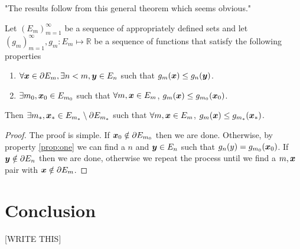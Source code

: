 		"The results follow from this general theorem which seems obvious."

		\begin{theorem}
			\label{thm:solution in interior}
			Let $(E_m)_{m=1}^\infty$ be a sequence of appropriately defined sets and let
			$(g_m)_{m=1}^\infty, g_m: E_m \mapsto \mathbb{R}$ be a sequence of
			functions that satisfy the following properties
			\begin{enumerate}
				\item $\forall {\bm{{x}}} \in \partial E_m, \exists n < m, {\bm{{y}}} \in E_n$ such that
				$g_m({\bm{{x}}}) \leq g_n({\bm{{y}}})$.
				\label{prop:one}
				\item $\exists m_0, {\bm{{x}}}_0 \in E_{m_0}$ such that $\forall m, {\bm{{x}}} \in 
				E_m$, $g_m({\bm{{x}}}) \leq g_{m_0}({\bm{{x}}}_0)$.
			\end{enumerate}
			Then $\exists m_*, {\bm{{x}}}_* \in E_{m_*} \setminus \partial E_{m_*}$ such
			that $\forall m, {\bm{{x}}} \in E_m$, $g_m({\bm{{x}}}) \leq g_{m_*}({\bm{{x}}}_*)$.
		\end{theorem}
		\begin{proof}
			The proof is simple. If ${\bm{{x}}}_0 \notin \partial E_{m_0}$ then we are done.
			Otherwise, by property \ref{prop:one} we can find a $n$ and ${\bm{{y}}} \in 
			E_n$ such that $g_n(y) = g_{m_0}({\bm{{x}}}_0)$. If ${\bm{{y}}} \notin \partial 
			E_n$ then we are done, otherwise we repeat the process until we find a $m, 
			{\bm{{x}}}$ pair with ${\bm{{x}}} \notin \partial E_m$. %
		\end{proof}

\section{Conclusion}

[WRITE THIS]